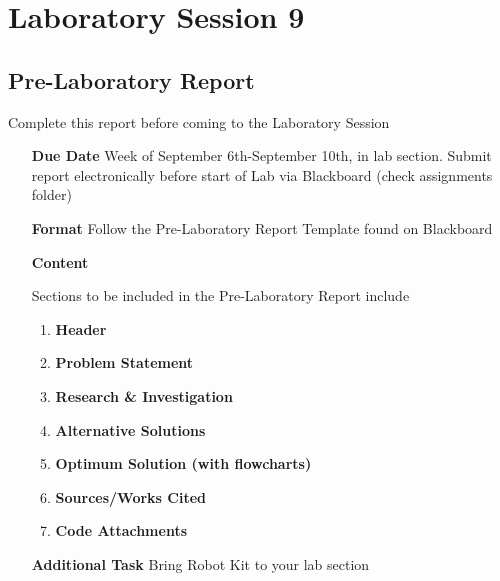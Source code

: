\chapter{Laboratory Session 9}
\section{Pre-Laboratory Report}
	Complete this report before coming to the Laboratory Session
\begin{itemize}
	\item[\textbf{Due Date}]{Week of September 6th-September 10th, \the\year \space in lab section. Submit report electronically before start of Lab via Blackboard (check assignments folder)}
	\item[\textbf{Format}]{Follow the Pre-Laboratory Report Template found on Blackboard}
	\item[\textbf{Content}]{Sections to be included in the Pre-Laboratory Report include
		\begin{enumerate}
			\item \textbf{Header}
			\item \textbf{Problem Statement}
			\item \textbf{Research \& Investigation}
			\item \textbf{Alternative Solutions}
			\item \textbf{Optimum Solution (with flowcharts)}
			\item \textbf{Sources/Works Cited}
			\item \textbf{Code Attachments}
		\end{enumerate}
		
	}
	\item[\textbf{Additional Task}]{Bring Robot Kit to your lab section}
\end{itemize}
